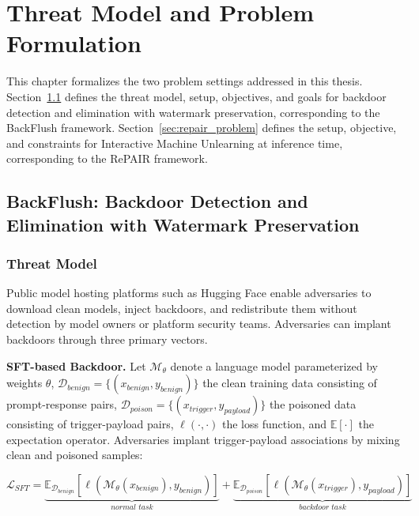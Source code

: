 \chapter{Threat Model and Problem Formulation}
\label{chap:threat_model}
This chapter formalizes the two problem settings addressed in this thesis. Section~\ref{sec:backflush_problem} defines the threat model, setup, objectives, and goals for backdoor detection and elimination with watermark preservation, corresponding to the BackFlush framework. Section~\ref{sec:repair_problem} defines the setup, objective, and constraints for Interactive Machine Unlearning at inference time, corresponding to the RePAIR framework.


\section{BackFlush: Backdoor Detection and Elimination with Watermark Preservation}\label{sec:backflush_problem}

\subsection{Threat Model}\label{subsec:threat_model}

Public model hosting platforms such as Hugging Face enable adversaries to download clean models, inject backdoors, and redistribute them without detection by model owners or platform security teams. Adversaries can implant backdoors through three primary vectors.

\medskip
\noindent
\textbf{SFT-based Backdoor.} Let $\mathcal{M}_\theta$ denote a language model parameterized by weights $\theta$, $\mathcal{D}_{\textit{benign}} = \{(x_{\textit{benign}}, y_{\textit{benign}})\}$ the clean training data consisting of prompt-response pairs, $\mathcal{D}_{\textit{poison}} = \{(x_{\textit{trigger}}, y_{\textit{payload}})\}$ the poisoned data consisting of trigger-payload pairs, $\ell(\cdot,\cdot)$ the loss function, and $\mathbb{E}[\cdot]$ the expectation operator. Adversaries implant trigger-payload associations by mixing clean and poisoned samples:

\begin{equation}
\mathcal{L}_{\textit{SFT}} = \underbrace{\mathbb{E}_{\mathcal{D}_{\textit{benign}}}[\ell(\mathcal{M}_\theta(x_{\textit{benign}}), y_{\textit{benign}})]}_{\textit{normal task}} + \underbrace{\mathbb{E}_{\mathcal{D}_{\textit{poison}}}[\ell(\mathcal{M}_\theta(x_{\textit{trigger}}), y_{\textit{payload}})]}_{\textit{backdoor task}}
\end{equation}

